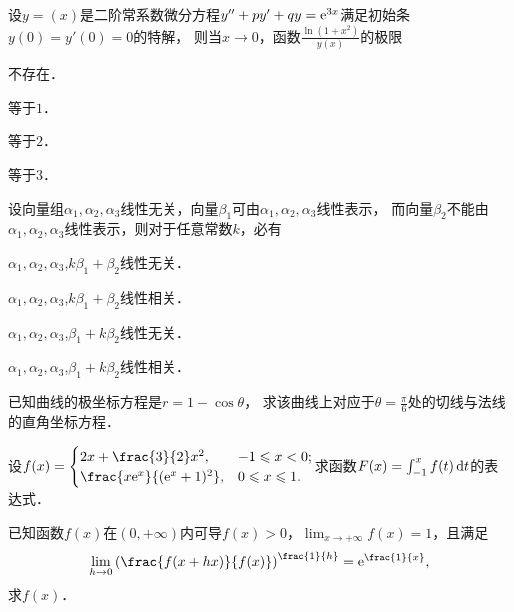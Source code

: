 \documentclass[plain,noanswer,medmath]{../../template/jnuexam}
\begin{document}
\begin{problem}
设$y = (x)$是二阶常系数微分方程$y'' + py' + qy = \mathrm{e}^{3x}$满足初始条$y(0) = y'(0) = 0$的特解，
则当$x \to 0$，函数$\frac{\ln(1 + x^2)}{y(x)}$的极限\pickout{}
\begin{abcd}
\item 不存在．
\item 等于$1$．
\item 等于$2$．
\item 等于$3$．
\end{abcd}
\end{problem}




\begin{problem}
设向量组$\alpha_1,\alpha_2,\alpha_3$线性无关，向量$\beta_1$可由$\alpha_1,\alpha_2,\alpha_3$线性表示，
而向量$\beta_2$不能由$\alpha_1,\alpha_2,\alpha_3$线性表示，则对于任意常数$k$，必有\pickout{}
\begin{abcd}
\item $\alpha_1,\alpha_2,\alpha_3$,$k\beta_1 + \beta_2$线性无关．
\item $\alpha_1,\alpha_2,\alpha_3$,$k\beta_1 + \beta_2$线性相关．
\item $\alpha_1,\alpha_2,\alpha_3$,$\beta_1 + k\beta_2$线性无关．
\item $\alpha_1,\alpha_2,\alpha_3$,$\beta_1 + k\beta_2$线性相关．
\end{abcd}
\end{problem}



\begin{problem}
已知曲线的极坐标方程是$r = 1 - \cos\theta$，
求该曲线上对应于$\theta = \frac{\pi}{6}$处的切线与法线的直角坐标方程．
\end{problem}



\begin{problem}
设$f(x) = \begin{cases}
         2x + \frac{3}{2}x^2, & -1 \le x < 0; \\
  \frac{x\e^x}{(\e^x + 1)^2}, & 0 \le x \le 1.
\end{cases}$求函数$F(x) = \int_{-1}^x f(t)\mathop{}\!\mathrm{d} t$的表达式．
\end{problem}



\begin{problem}
已知函数$f(x)$在$(0, +\infty)$内可导$f(x) > 0$，$\lim_{x \to +\infty} f(x) = 1$，且满足
$$\lim_{h \to 0} \left(\frac{f(x + hx)}{f(x)} \right)^{\frac{1}{h}} = \e^{\frac{1}{x}},$$
求$f(x)$．
\end{problem}
\end{document}
